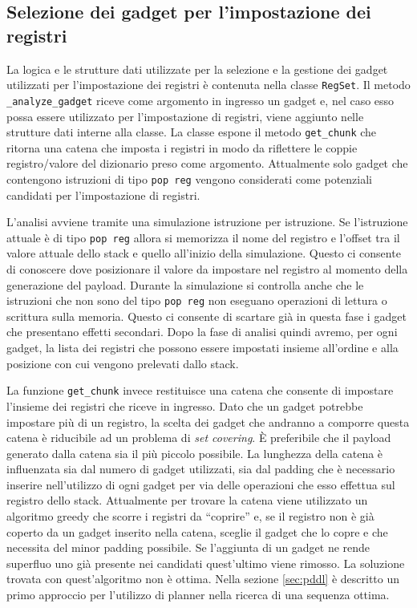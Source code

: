 \subsection{Selezione dei gadget per l'impostazione dei registri}

La logica e le strutture dati utilizzate per la selezione e la
gestione dei gadget utilizzati per l'impostazione dei registri è
contenuta nella classe \lstinline{RegSet}. Il metodo
\lstinline{_analyze_gadget} riceve come argomento in ingresso un
gadget e, nel caso esso possa essere utilizzato per l'impostazione di
registri, viene aggiunto nelle strutture dati interne alla classe. La
classe espone il metodo \lstinline{get_chunk} che ritorna una catena
che imposta i registri in modo da riflettere le coppie registro/valore
del dizionario preso come argomento. Attualmente solo gadget che
contengono istruzioni di tipo \lstinline{pop reg} vengono considerati
come potenziali candidati per l'impostazione di registri.

L'analisi avviene tramite una simulazione istruzione per
istruzione. Se l'istruzione attuale è di tipo \lstinline{pop reg}
allora si memorizza il nome del registro e l'offset tra il valore
attuale dello stack e quello all'inizio della simulazione. Questo ci
consente di conoscere dove posizionare il valore da impostare nel
registro al momento della generazione del payload. Durante la
simulazione si controlla anche che le istruzioni che non sono del tipo
\lstinline{pop reg} non eseguano operazioni di lettura o scrittura
sulla memoria. Questo ci consente di scartare già in questa fase i
gadget che presentano effetti secondari. Dopo la fase di analisi
quindi avremo, per ogni gadget, la lista dei registri che possono
essere impostati insieme all'ordine e alla posizione con cui vengono
prelevati dallo stack. 


La funzione \lstinline{get_chunk} invece restituisce una catena che
consente di impostare l'insieme dei registri che riceve in
ingresso. Dato che un gadget potrebbe impostare più di un registro, la
scelta dei gadget che andranno a comporre questa catena è riducibile
ad un problema di \emph{set covering}. È preferibile che il payload
generato dalla catena sia il più piccolo possibile. La lunghezza della
catena è influenzata sia dal numero di gadget utilizzati, sia dal
padding che è necessario inserire nell'utilizzo di ogni gadget per via
delle operazioni che esso effettua sul registro dello
stack. Attualmente per trovare la catena viene utilizzato un algoritmo
greedy che scorre i registri da ``coprire'' e, se il registro non è
già coperto da un gadget inserito nella catena, sceglie il gadget che
lo copre e che necessita del minor padding possibile. Se l'aggiunta di
un gadget ne rende superfluo uno già presente nei candidati
quest'ultimo viene rimosso. La soluzione trovata con quest'algoritmo
non è ottima. Nella sezione \ref{sec:pddl} è descritto un primo
approccio per l'utilizzo di planner nella ricerca di una sequenza
ottima.

